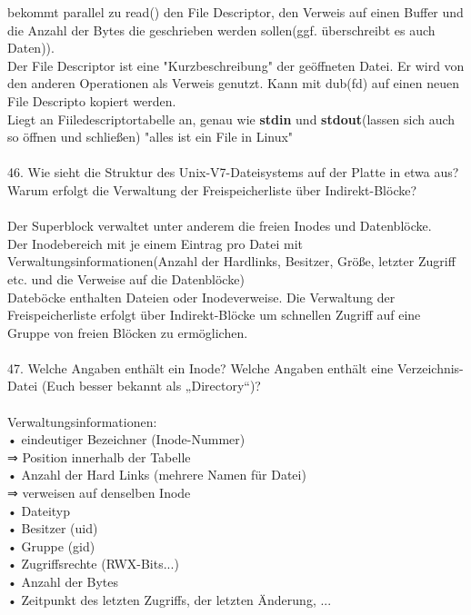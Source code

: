 \documentclass{article}
\newcommand\tab[1][1cm]{\hspace*{#1}}
\begin{document}
\tab bekommt parallel zu read() den File Descriptor, den Verweis auf einen Buffer und die Anzahl der Bytes die geschrieben werden sollen(ggf. \"uberschreibt es auch Daten)).\\
Der File Descriptor ist eine "Kurzbeschreibung" der ge\"offneten Datei. Er wird von den anderen Operationen als Verweis genutzt. Kann mit dub(fd)  auf einen neuen File Descripto kopiert werden.
\\
Liegt an Fiiledescriptortabelle an, genau wie \textbf{stdin} und \textbf{stdout}(lassen sich auch so \"offnen und schlie\ss en) "alles ist ein File in Linux"
\\
\\
46. Wie sieht die Struktur des Unix-V7-Dateisystems auf der Platte in etwa aus? Warum erfolgt
die Verwaltung der Freispeicherliste über Indirekt-Blöcke?
\\
\\
Der Superblock verwaltet unter anderem die freien Inodes und Datenbl\"ocke.\\
Der Inodebereich mit je einem Eintrag pro Datei mit Verwaltungsinformationen(Anzahl der Hardlinks, Besitzer, Gr\"o\ss e, letzter Zugriff etc. und die Verweise auf die Datenbl\"ocke)\\
Dateb\"ocke enthalten Dateien oder Inodeverweise.
Die Verwaltung der Freispeicherliste erfolgt \"uber Indirekt-Bl\"ocke um schnellen Zugriff auf eine Gruppe von freien Bl\"ocken zu erm\"oglichen.
\\
\\
47. Welche Angaben enthält ein Inode? Welche Angaben enthält eine Verzeichnis-Datei (Euch
besser bekannt als „Directory“)?
\\
\\
Verwaltungsinformationen:\\
\tab • eindeutiger Bezeichner (Inode-Nummer)\\
\tab \tab ⇒ Position innerhalb der Tabelle\\
\tab • Anzahl der Hard Links (mehrere Namen für Datei)\\
\tab \tab ⇒ verweisen auf denselben Inode\\
\tab • Dateityp\\
\tab • Besitzer (uid)\\
\tab • Gruppe (gid)\\
\tab • Zugriffsrechte (RWX-Bits...)\\
\tab • Anzahl der Bytes\\
\tab • Zeitpunkt des letzten Zugriffs, der letzten Änderung, ...\\
\end{document}
